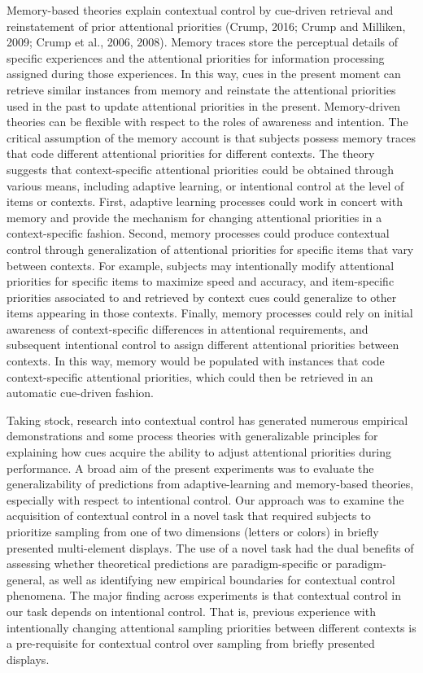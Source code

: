 \documentclass[]{DissertateCUNY}
\begin{document}
Memory-based theories explain contextual control by cue-driven retrieval
and reinstatement of prior attentional priorities (Crump, 2016; Crump
and Milliken, 2009; Crump et al., 2006, 2008). Memory traces store the
perceptual details of specific experiences and the attentional
priorities for information processing assigned during those experiences.
In this way, cues in the present moment can retrieve similar instances
from memory and reinstate the attentional priorities used in the past to
update attentional priorities in the present. Memory-driven theories can
be flexible with respect to the roles of awareness and intention. The
critical assumption of the memory account is that subjects possess
memory traces that code different attentional priorities for different
contexts. The theory suggests that context-specific attentional
priorities could be obtained through various means, including adaptive
learning, or intentional control at the level of items or contexts.
First, adaptive learning processes could work in concert with memory and
provide the mechanism for changing attentional priorities in a
context-specific fashion. Second, memory processes could produce
contextual control through generalization of attentional priorities for
specific items that vary between contexts. For example, subjects may
intentionally modify attentional priorities for specific items to
maximize speed and accuracy, and item-specific priorities associated to
and retrieved by context cues could generalize to other items appearing
in those contexts. Finally, memory processes could rely on initial
awareness of context-specific differences in attentional requirements,
and subsequent intentional control to assign different attentional
priorities between contexts. In this way, memory would be populated with
instances that code context-specific attentional priorities, which could
then be retrieved in an automatic cue-driven fashion.

Taking stock, research into contextual control has generated numerous
empirical demonstrations and some process theories with generalizable
principles for explaining how cues acquire the ability to adjust
attentional priorities during performance. A broad aim of the present
experiments was to evaluate the generalizability of predictions from
adaptive-learning and memory-based theories, especially with respect to
intentional control. Our approach was to examine the acquisition of
contextual control in a novel task that required subjects to prioritize
sampling from one of two dimensions (letters or colors) in briefly
presented multi-element displays. The use of a novel task had the dual
benefits of assessing whether theoretical predictions are
paradigm-specific or paradigm-general, as well as identifying new
empirical boundaries for contextual control phenomena. The major finding
across experiments is that contextual control in our task depends on
intentional control. That is, previous experience with intentionally
changing attentional sampling priorities between different contexts is a
pre-requisite for contextual control over sampling from briefly
presented displays.
\end{document}
